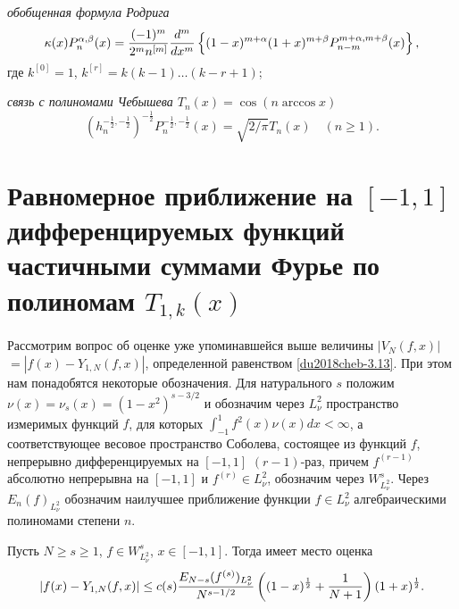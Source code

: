 \textit{обобщенная формула Родрига}
\begin{equation}\label{du2018cheb-4.4}
\kappa(x) P_n^{\alpha,\beta}(x)
={(-1)^m\over2^mn^{[m]}}{d^m\over dx^m}
\left\{(1-x)^{m+\alpha}(1+x)^{m+\beta} P_{n-m}^{m+\alpha,m+\beta}(x)
\right\},
\end{equation}
где $k^{[0]}=1$, $k^{[r]}=k(k-1)\dots(k-r+1)$;

\textit{связь с полиномами Чебышева $T_n(x)=\cos(n\arccos x)$}
\begin{equation}\label{du2018cheb-4.5}
\left(h_n^{-\frac12,-\frac12}\right)^{-\frac12}P_n^{-\frac{1}{2},-\frac{1}{2}}(x)
=\sqrt{2/\pi}T_n(x)\quad (n\ge1).
\end{equation}



\section{Равномерное приближение на $[-1,1]$ дифференцируемых функций частичными суммами Фурье по полиномам $T_{1,k}(x)$ }
Рассмотрим вопрос об оценке уже упоминавшейся выше величины $|V_N(f,x)|$ $=|f(x)- Y_{1,N}(f,x)|$, определенной равенством \eqref{du2018cheb-3.13}. При этом нам понадобятся некоторые обозначения. Для натурального $s$ положим $\nu(x)=\nu_s(x)=(1-x^2)^{s-3/2}$ и обозначим через $L_{\nu}^2$ пространство измеримых функций $f$, для которых $\int_{-1}^1f^2(x)\nu(x)dx<\infty$, а соответствующее весовое пространство Соболева,  состоящее из функций $f$, непрерывно дифференцируемых на $[-1,1]$ $(r-1)$-раз, причем $f^{(r-1)}$ абсолютно непрерывна на $[-1,1]$  и $f^{(r)}\in L^2_{\nu}$, обозначим через $W^s_{L^2_{\nu}}$. Через $E_n(f)_{L^2_{\nu}}$  обозначим наилучшее приближение функции
$f\in L^2_{\nu}$ алгебраическими полиномами степени $n$.

\begin{theorem}\label{du2018cheb-th3}    Пусть $N\ge s\ge1$, $f\in W_{L^2_{\nu}}^s$, $x\in[-1,1]$. Тогда имеет  место оценка
	$$
	|f(x)- Y_{1,N}(f,x)|\le c(s) {E_{N-s}(f^{(s)})_{L^2_\nu}\over N^{s-1/2}}
	\left((1-x)^\frac12+\frac1{N+1}\right)(1+x)^\frac12.
	$$
\end{theorem}


